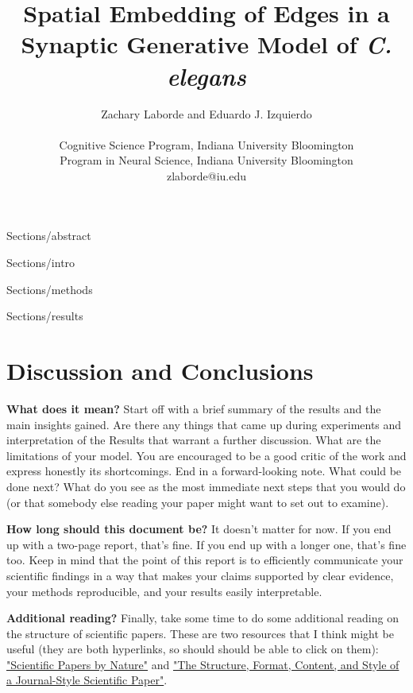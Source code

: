 \documentclass[letterpaper]{article}
\title{Spatial Embedding of Edges in a Synaptic Generative Model of \textit{C. elegans}}
\author{Zachary Laborde and Eduardo J. Izquierdo\\
\mbox{}\\
Cognitive Science Program, Indiana University Bloomington\\
Program in Neural Science, Indiana University Bloomington\\
zlaborde@iu.edu}
\begin{document}
\maketitle

{Sections/abstract}

{Sections/intro}

{Sections/methods}

{Sections/results}

\section{Discussion and Conclusions}
{\bf  What does it mean?} Start off with a brief summary of the results and the main insights gained. Are there any things that came up during experiments and interpretation of the Results that warrant a further discussion. What are the limitations of your model. You are encouraged to be a good critic of the work and express honestly its shortcomings. End in a forward-looking note. What could be done next? What do you see as the most immediate next steps that you would do (or that somebody else reading your paper might want to set out to examine). 

{\bf How long should this document be?} It doesn't matter for now. If you end up with a two-page report, that's fine. If you end up with a longer one, that's fine too. Keep in mind that the point of this report is to efficiently communicate your scientific findings in a way that makes your claims supported by clear evidence, your methods reproducible, and your results easily interpretable. 

{\bf Additional reading?} Finally, take some time to do some additional reading on the structure of scientific papers. These are two resources that I think might be useful (they are both hyperlinks, so should should be able to click on them): 
\href{https://www.nature.com/scitable/topicpage/scientific-papers-13815490/}{"Scientific Papers by Nature"} and
\href{https://abacus.bates.edu/~ganderso/biology/resources/writing/HTWsections.html}{"The Structure, Format, Content, and Style of a  Journal-Style Scientific Paper"}. 

\footnotesize


\end{document}
